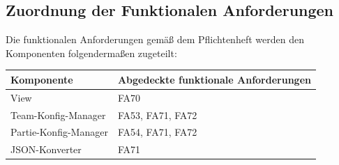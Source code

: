 \subsection{Zuordnung der Funktionalen Anforderungen}

Die funktionalen Anforderungen gemäß dem Pflichtenheft werden den Komponenten folgendermaßen zugeteilt:

\begin{table}[h]
    \centering
    \begin{tabular}{|l|l|}
        \hline
        \textbf{Komponente} & \textbf{Abgedeckte funktionale Anforderungen}\\ \hline 
        
        View & FA70   \\ \hline     
        
        Team-Konfig-Manager & FA53, FA71, FA72 \\ \hline

        Partie-Konfig-Manager & FA54, FA71, FA72 \\ \hline

        JSON-Konverter & FA71 \\ \hline


    \end{tabular}
\end{table}
